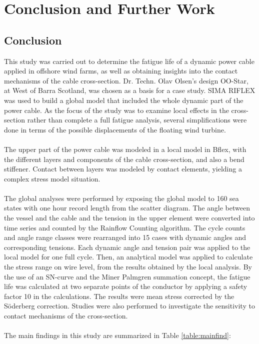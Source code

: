 \chapter{Conclusion and Further Work}
\label{chap:conclusion}
\section{Conclusion}
This study was carried out to determine the fatigue life of a dynamic power cable applied in offshore wind farms, as well as obtaining insights into the contact mechanisms of the cable cross-section. Dr. Techn. Olav Olsen's design OO-Star, at West of Barra Scotland, was chosen as a basis for a case study. SIMA RIFLEX was used to build a global model that included the whole dynamic part of the power cable.  As the focus of the study was to examine local effects in the cross-section rather than complete a full fatigue analysis, several simplifications were done in terms of the possible displacements of the floating wind turbine. \\\\The upper part of the power cable was modeled in a local model in Bflex, with the different layers and components of the cable cross-section, and also a bend stiffener. Contact between layers was modeled by contact elements, yielding a complex stress model situation.\\\\
The global analyses were performed by exposing the global model to 160 sea states with one hour record length from the scatter diagram. The angle between the vessel and the cable and the tension in the upper element were converted into time series and counted by the Rainflow Counting algorithm. The cycle counts and angle range classes were rearranged into 15 cases with dynamic angles and corresponding tensions. Each dynamic angle and tension pair was applied to the local model for one full cycle. Then, an analytical model was applied to calculate the stress range on wire level, from the results obtained by the local analysis. By the use of an SN-curve and the Miner Palmgren summation concept, the fatigue life was calculated at two separate points of the conductor by applying a safety factor 10 in the calculations. The results were mean stress corrected by the Söderberg correction. Studies were also performed to investigate the sensitivity to contact mechanisms of the cross-section.
\\\\The main findings in this study are summarized in Table \ref{table:mainfind}:

